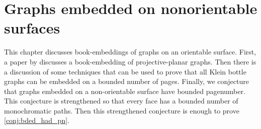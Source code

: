 \chapter{Graphs embedded on nonorientable surfaces}\label{chap:nonorientable}

This chapter discusses book-embeddings of graphs on an orientable surface. First, a paper by \textcite{nakamotoBookEmbeddingProjectiveplanar2015} discusses a book-embedding of projective-planar graphs. Then there is a discussion of some techniques that can be used to prove that all Klein bottle graphs can be embedded on a bounded number of pages. Finally, we conjecture that graphs embedded on a non-orientable surface have bounded pagenumber. This conjecture is strengthened so that every face has a bounded number of monochromatic paths. Then this strengthened conjecture is enough to prove \cref{conj:bded_had_pn}.








